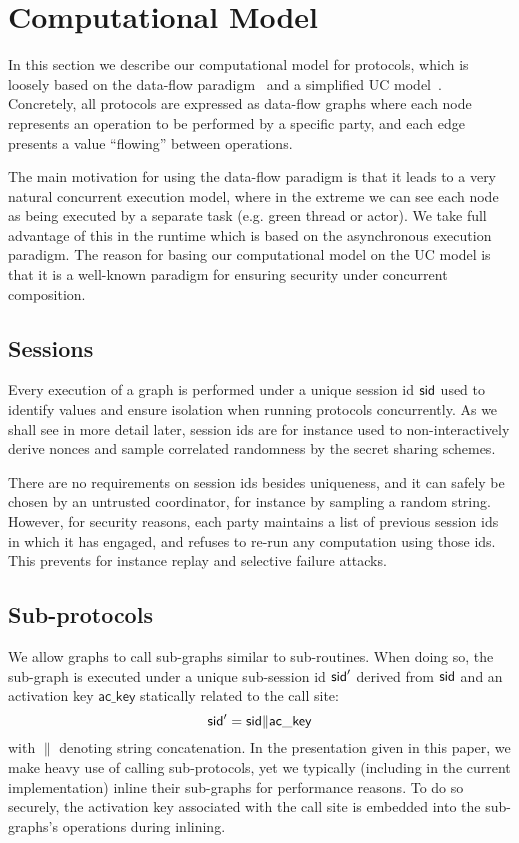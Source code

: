 \section{Computational Model}

In this section we describe our computational model for protocols, which is loosely based on the data-flow paradigm~\cite{abadi16} and a simplified UC model~\cite{canetti-cohen-lindell15}. Concretely, all protocols are expressed as data-flow graphs where each node represents an operation to be performed by a specific party, and each edge presents a value ``flowing'' between operations.

The main motivation for using the data-flow paradigm is that it leads to a very natural concurrent execution model, where in the extreme we can see each node as being executed by a separate task (e.g. green thread or actor). We take full advantage of this in the runtime which is based on the asynchronous execution paradigm. The reason for basing our computational model on the UC model is that it is a well-known paradigm for ensuring security under concurrent composition.


\subsection{Sessions}

Every execution of a graph is performed under a unique session id $\mathsf{sid}$ used to identify values and ensure isolation when running protocols concurrently. As we shall see in more detail later, session ids are for instance used to non-interactively derive nonces and sample correlated randomness by the secret sharing schemes.

There are no requirements on session ids besides uniqueness, and it can safely be chosen by an untrusted coordinator, for instance by sampling a random string. However, for security reasons, each party maintains a list of previous session ids in which it has engaged, and refuses to re-run any computation using those ids. This prevents for instance replay and selective failure attacks.


\subsection{Sub-protocols}

We allow graphs to call sub-graphs similar to sub-routines. When doing so, the sub-graph is executed under a unique sub-session id $\mathsf{sid}'$ derived from $\mathsf{sid}$ and an activation key $\mathsf{ac\_key}$ statically related to the call site: 
$$
\mathsf{sid}' = \mathsf{sid} \| \mathsf{ac\_key}
$$
with $\|$ denoting string concatenation. In the presentation given in this paper, we make heavy use of calling sub-protocols, yet we typically (including in the current implementation) inline their sub-graphs for performance reasons. To do so securely, the activation key associated with the call site is embedded into the sub-graphs's operations during inlining.

